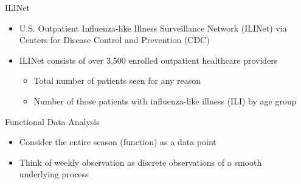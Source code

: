 \documentclass[final]{beamer}
\newlength{\sepwid}
\newlength{\onecolwid}
\begin{document}
\begin{frame}[t] %

\begin{columns}[t] %

\begin{column}{\sepwid}\end{column} %

\begin{column}{\onecolwid} %


\begin{alertblock}{ILINet}

\begin{itemize}
\item U.S. Outpatient Influenza-like Illness Surveillance Network (ILINet) via Centers for Disease Control and Prevention (CDC)
\item ILINet consists of over 3,500 enrolled outpatient healthcare providers %
\begin{itemize}
\item Total number of patients seen for any reason 
\item Number of those patients with influenza-like illness (ILI) by age group 
\end{itemize}
\end{itemize}

\end{alertblock}


\begin{block}{Functional Data Analysis}

\begin{itemize}
\item Consider the entire season (function) as a data point
\item Think of weekly observation as discrete observations of a smooth underlying process
\end{itemize}
\end{block}


\end{column}
\end{columns}
\end{frame}
\end{document}
